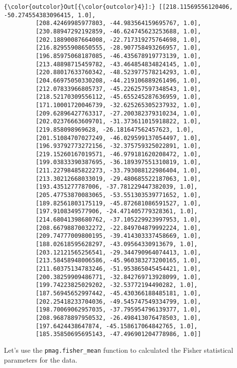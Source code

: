 \documentclass{article}
\begin{document}
            \begin{Verbatim}[commandchars=\\\{\}]
{\color{outcolor}Out[{\color{outcolor}4}]:} [[218.11569556120406, -50.274554383096415, 1.0],
         [208.42469985977803, -44.983564159695767, 1.0],
         [230.88947292192859, -46.624745623253688, 1.0],
         [202.18890087664008, -22.717319275764698, 1.0],
         [216.82955908650555, -28.907758493266957, 1.0],
         [196.85975068187085, -46.435678919773139, 1.0],
         [213.48898715459782, -43.464854834824145, 1.0],
         [220.88017633760342, -48.523977578214293, 1.0],
         [204.66975050330208, -44.219106889261496, 1.0],
         [212.07833966805737, -45.226257597348543, 1.0],
         [218.52170309556112, -45.655245287636959, 1.0],
         [171.10001720046739, -32.625265305237932, 1.0],
         [209.62896427763317, -27.200382379310234, 1.0],
         [202.02376663609701, -31.373611015918822, 1.0],
         [219.858098969628, -26.181647562457623, 1.0],
         [201.51084707027249, -46.029599137054497, 1.0],
         [196.93792773272156, -32.375759325022891, 1.0],
         [219.15260167019571, -46.979181620208472, 1.0],
         [199.03833390387695, -36.189397551310819, 1.0],
         [211.22798485822273, -33.793088122986404, 1.0],
         [213.30212668033019, -29.480685522187063, 1.0],
         [193.4351277787006, -37.781229447382039, 1.0],
         [205.47753870083065, -53.551303539771652, 1.0],
         [189.82561803175119, -45.872681086591527, 1.0],
         [197.9108349577906, -24.471405779328361, 1.0],
         [214.68041398680762, -37.105229923997953, 1.0],
         [208.66798870032272, -22.849704879992224, 1.0],
         [209.74777009800195, -39.414303337458669, 1.0],
         [188.02618595628297, -43.09564330913679, 1.0],
         [203.12121565256541, -29.344790964074413, 1.0],
         [213.58458948006586, -45.960383273200165, 1.0],
         [211.60375134783246, -51.953865045454421, 1.0],
         [200.38259909486771, -32.842769713928099, 1.0],
         [199.74223825029202, -32.53772194490282, 1.0],
         [187.56945652997442, -45.430366188485181, 1.0],
         [202.25418233704036, -49.545747549334799, 1.0],
         [198.70069062957035, -37.795954796139377, 1.0],
         [208.96878897950532, -26.498413076478503, 1.0],
         [197.6424438647874, -45.158617064842765, 1.0],
         [185.35850695695143, -47.496901204778986, 1.0]]
\end{Verbatim}
        
    Let's use the \texttt{pmag.fisher\_mean} function to calculated the
Fisher statistical parameters for the data.
\end{document}
